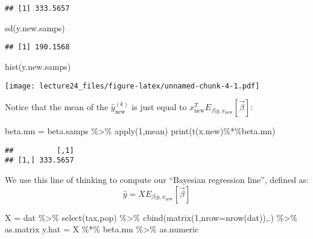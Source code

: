 \documentclass[
]{article}
\newenvironment{Shaded}{\begin{snugshade}}{\end{snugshade}}
\newcommand{\AttributeTok}[1]{\textcolor[rgb]{0.77,0.63,0.00}{#1}}
\newcommand{\DecValTok}[1]{\textcolor[rgb]{0.00,0.00,0.81}{#1}}
\newcommand{\FunctionTok}[1]{\textcolor[rgb]{0.00,0.00,0.00}{#1}}
\newcommand{\NormalTok}[1]{#1}
\newcommand{\OtherTok}[1]{\textcolor[rgb]{0.56,0.35,0.01}{#1}}
\newcommand{\SpecialCharTok}[1]{\textcolor[rgb]{0.00,0.00,0.00}{#1}}
\begin{document}
\begin{verbatim}
## [1] 333.5657
\end{verbatim}

\begin{Shaded}
\begin{Highlighting}[]
\FunctionTok{sd}\NormalTok{(y.new.samps)}
\end{Highlighting}
\end{Shaded}

\begin{verbatim}
## [1] 190.1568
\end{verbatim}

\begin{Shaded}
\begin{Highlighting}[]
\FunctionTok{hist}\NormalTok{(y.new.samps)}
\end{Highlighting}
\end{Shaded}

\texttt{[image: lecture24\_files/figure-latex/unnamed-chunk-4-1.pdf]}

Notice that the mean of the \(\hat y_{\text{new}}^{(k)}\) is just equal
to \(x_{\text{new}}^T E_{\beta|y,x_{\text{new}}}[\vec \beta]\):

\begin{Shaded}
\begin{Highlighting}[]
\NormalTok{beta.mn }\OtherTok{=}\NormalTok{ beta.samps }\SpecialCharTok{\%\textgreater{}\%} \FunctionTok{apply}\NormalTok{(}\DecValTok{1}\NormalTok{,mean)}
\FunctionTok{print}\NormalTok{(}\FunctionTok{t}\NormalTok{(x.new)}\SpecialCharTok{\%*\%}\NormalTok{beta.mn)}
\end{Highlighting}
\end{Shaded}

\begin{verbatim}
##          [,1]
## [1,] 333.5657
\end{verbatim}

We use this line of thinking to compute our ``Bayesian regression
line'', defined as: \[
\hat y = X E_{\beta|y,x_{\text{new}}}[\vec \beta]
\]

\begin{Shaded}
\begin{Highlighting}[]
\NormalTok{X }\OtherTok{=}\NormalTok{ dat }\SpecialCharTok{\%\textgreater{}\%} \FunctionTok{select}\NormalTok{(tax,pop) }\SpecialCharTok{\%\textgreater{}\%} \FunctionTok{cbind}\NormalTok{(}\FunctionTok{matrix}\NormalTok{(}\DecValTok{1}\NormalTok{,}\AttributeTok{nrow=}\FunctionTok{nrow}\NormalTok{(dat)),.) }\SpecialCharTok{\%\textgreater{}\%}\NormalTok{ as.matrix}
\NormalTok{y.hat }\OtherTok{=}\NormalTok{ X }\SpecialCharTok{\%*\%}\NormalTok{ beta.mn }\SpecialCharTok{\%\textgreater{}\%}\NormalTok{ as.numeric}
\end{Highlighting}
\end{Shaded}
\end{document}
